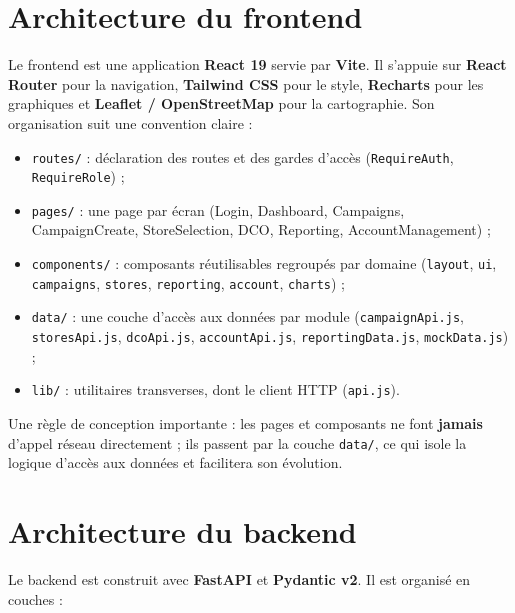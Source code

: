\section{Architecture du frontend}

Le frontend est une application \textbf{React 19} servie par \textbf{Vite}. Il
s'appuie sur \textbf{React Router} pour la navigation, \textbf{Tailwind CSS}
pour le style, \textbf{Recharts} pour les graphiques et \textbf{Leaflet /
OpenStreetMap} pour la cartographie. Son organisation suit une convention
claire :

\begin{itemize}
  \item \texttt{routes/} : déclaration des routes et des gardes d'accès
        (\texttt{RequireAuth}, \texttt{RequireRole}) ;
  \item \texttt{pages/} : une page par écran (Login, Dashboard, Campaigns,
        CampaignCreate, StoreSelection, DCO, Reporting, AccountManagement) ;
  \item \texttt{components/} : composants réutilisables regroupés par domaine
        (\texttt{layout}, \texttt{ui}, \texttt{campaigns}, \texttt{stores},
        \texttt{reporting}, \texttt{account}, \texttt{charts}) ;
  \item \texttt{data/} : une couche d'accès aux données par module
        (\texttt{campaignApi.js}, \texttt{storesApi.js}, \texttt{dcoApi.js},
        \texttt{accountApi.js}, \texttt{reportingData.js}, \texttt{mockData.js}) ;
  \item \texttt{lib/} : utilitaires transverses, dont le client HTTP
        (\texttt{api.js}).
\end{itemize}

Une règle de conception importante : les pages et composants ne font
\textbf{jamais} d'appel réseau directement ; ils passent par la couche
\texttt{data/}, ce qui isole la logique d'accès aux données et facilitera son
évolution.

\section{Architecture du backend}

Le backend est construit avec \textbf{FastAPI} et \textbf{Pydantic v2}. Il est
organisé en couches :


